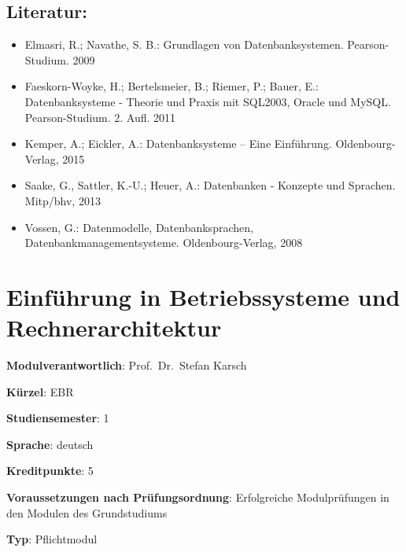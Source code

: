 \section*{Literatur:}\label{literatur-5}

\begin{itemize}
\tightlist
\item
  Elmasri, R.; Navathe, S. B.: Grundlagen von Datenbanksystemen.
  Pearson-Studium. 2009
\item
  Faeskorn-Woyke, H.; Bertelsmeier, B.; Riemer, P.; Bauer, E.:
  Datenbanksysteme - Theorie und Praxis mit SQL2003, Oracle und MySQL.
  Pearson-Studium. 2. Aufl. 2011
\item
  Kemper, A.; Eickler, A.: Datenbanksysteme -- Eine Einführung.
  Oldenbourg-Verlag, 2015
\item
  Saake, G., Sattler, K.-U.; Heuer, A.: Datenbanken - Konzepte und
  Sprachen. Mitp/bhv, 2013
\item
  Vossen, G.: Datenmodelle, Datenbanksprachen,
  Datenbankmanagementsysteme. Oldenbourg-Verlag, 2008
\end{itemize}

\chapter{Einführung in Betriebssysteme und
Rechnerarchitektur}\label{einfuxfchrung-in-betriebssysteme-und-rechnerarchitektur}

\begin{modulHead}
\textbf{Modulverantwortlich}: Prof.~Dr.~Stefan
Karsch
\end{modulHead}
\begin{modulHead}
\textbf{Kürzel}:
EBR
\end{modulHead}
\begin{modulHead}
\textbf{Studiensemester}:
1
\end{modulHead}
\begin{modulHead}
\textbf{Sprache}:
deutsch
\end{modulHead}
\begin{modulHead}
\textbf{Kreditpunkte}:
5
\end{modulHead}
\begin{modulHead}
\textbf{Voraussetzungen nach
Prüfungsordnung}: Erfolgreiche Modulprüfungen in den Modulen des
Grundstudiums
\end{modulHead}
\begin{modulHead}
\textbf{Typ}:
Pflichtmodul
\end{modulHead}


